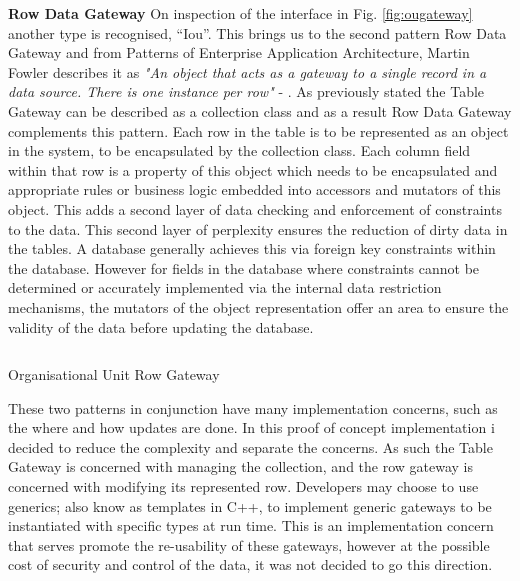 		\large{\bfseries{Row Data Gateway}}
		\newline
		\normalsize
		{
			\label{sec:RowDataGateway}
			On inspection of the interface in Fig. \ref{fig:ougateway} another type is recognised, ``Iou''.  This brings us to the second pattern Row Data Gateway
			and from Patterns of Enterprise Application Architecture, Martin Fowler describes it as \emph{ 
			"An object that acts as a gateway to a single record in a data source. There is one instance per row" } - \citet{FowlerPatternsArchiteture}.  
			As previously stated the Table Gateway can be described as a collection class and as a result Row Data Gateway complements this pattern.  
			\newline
			\newline
			Each row in the table is to be represented as an object in the system, to be encapsulated by the collection class.  
			Each column field within that row is a property of this object which needs to be encapsulated and appropriate rules or business logic embedded
			into accessors and mutators of this object.  This adds a second layer of data checking and enforcement of constraints to the data.  This second layer
			of perplexity ensures the reduction of dirty data in the tables. A database generally achieves this via foreign key constraints within the database.  
			However for fields in the database where constraints cannot be determined or accurately implemented via the internal data restriction mechanisms,
			the mutators of the object representation offer an area to ensure the validity of the data before updating the database.	
		}
		
		\vspace{5mm}
		\begin{figurehere}
			\inputminted[linenos=true,fontsize=\footnotesize,tabsize=2]{csharp}{pages/chapter3/smippets/ou}
			\vspace{-2mm}
			\caption{Organisational Unit Row Gateway}
			\label{fig:ou}
		\end{figurehere}
					
		\vspace{5mm}
		\normalsize
		{
			These two patterns in conjunction have many implementation concerns, such as the where and how updates are done.
			In this proof of concept implementation i decided to reduce the complexity and separate the concerns.  As such the 
			Table Gateway is concerned with managing the collection, and the row gateway is concerned with modifying its represented row.
			\newline
			\newline
			Developers may choose to use generics; also know as templates in C++, to implement generic gateways to be instantiated
			with specific types at run time.  This is an implementation concern that serves promote the re-usability of these gateways, however
			at the possible cost of security and control of the data, it was not decided to go this direction.
			\newline
		}	
		

